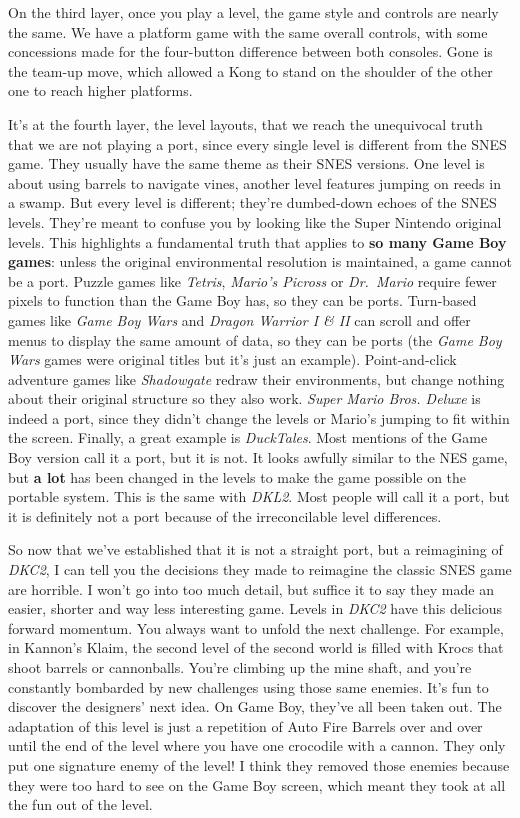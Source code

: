 \documentclass{book}
\begin{document}
On the third layer, once you play a level, the game style and controls are nearly the same. We have a platform game with the same overall controls, with some concessions made for the four-button difference between both consoles. Gone is the team-up move, which allowed a Kong to stand on the shoulder of the other one to reach higher platforms.

It’s at the fourth layer, the level layouts, that we reach the unequivocal truth that we are not playing a port, since every single level is different from the SNES game. They usually have the same theme as their SNES versions. One level is about using barrels to navigate vines, another level features jumping on reeds in a swamp. But every level is different; they’re dumbed-down echoes of the SNES levels. They’re meant to confuse you by looking like the Super Nintendo original levels. This highlights a fundamental truth that applies to \textbf{so many Game Boy games}: unless the original environmental resolution is maintained, a game cannot be a port. Puzzle games like \emph{Tetris}, \emph{Mario’s Picross} or \emph{Dr. Mario} require fewer pixels to function than the Game Boy has, so they can be ports. Turn-based games like \emph{Game Boy Wars} and \emph{Dragon Warrior I \& II} can scroll and offer menus to display the same amount of data, so they can be ports (the \emph{Game Boy Wars} games were original titles but it’s just an example). Point-and-click adventure games like \emph{Shadowgate} redraw their environments, but change nothing about their original structure so they also work. \emph{Super Mario Bros. Deluxe} is indeed a port, since they didn’t change the levels or Mario’s jumping to fit within the screen. Finally, a great example is \emph{DuckTales}. Most mentions of the Game Boy version call it a port, but it is not. It looks awfully similar to the NES game, but \textbf{a lot} has been changed in the levels to make the game possible on the portable system. This is the same with \emph{DKL2}. Most people will call it a port, but it is definitely not a port because of the irreconcilable level differences.

So now that we’ve established that it is not a straight port, but a reimagining of \emph{DKC2}, I can tell you the decisions they made to reimagine the classic SNES game are horrible. I won’t go into too much detail, but suffice it to say they made an easier, shorter and way less interesting game. Levels in \emph{DKC2} have this delicious forward momentum. You always want to unfold the next challenge. For example, in Kannon’s Klaim, the second level of the second world is filled with Krocs that shoot barrels or cannonballs. You’re climbing up the mine shaft, and you’re constantly bombarded by new challenges using those same enemies. It’s fun to discover the designers’ next idea. On Game Boy, they’ve all been taken out. The adaptation of this level is just a repetition of Auto Fire Barrels over and over until the end of the level where you have one crocodile with a cannon. They only put one signature enemy of the level! I think they removed those enemies because they were too hard to see on the Game Boy screen, which meant they took at all the fun out of the level.
\end{document}
